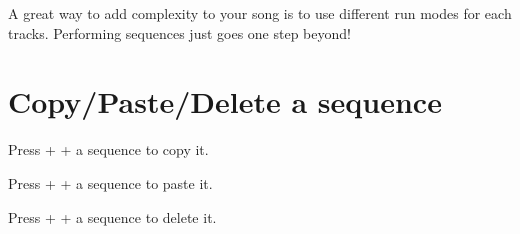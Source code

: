 A great way to add complexity to your song is to use different run modes for each tracks. Performing sequences just goes one step beyond!



\section{Copy/Paste/Delete a sequence}

Press  +  + a sequence \stepbystepicon{} to copy it.

Press  +  + a sequence \stepbystepicon{} to paste it.

Press  +  + a sequence \stepbystepicon{} to delete it.
